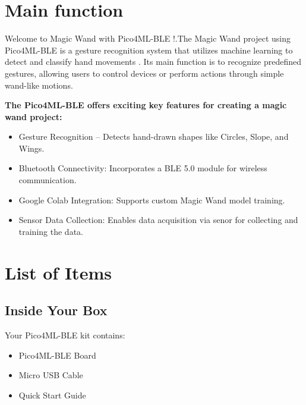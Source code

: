 %
%


\chapter{Main function}


Welcome to Magic Wand with Pico4ML-BLE !.The Magic Wand project using Pico4ML-BLE is a gesture recognition system that utilizes machine learning to detect and classify hand movements \cite{arducam}. Its main function is to recognize predefined gestures, allowing users to control devices or perform actions through simple wand-like motions.

\bigskip

\textbf{The Pico4ML-BLE offers exciting key features for creating a magic wand project:}

\begin{itemize}
    \item Gesture Recognition – Detects hand-drawn shapes like Circles, Slope, and Wings.
    \item Bluetooth Connectivity: Incorporates a BLE 5.0 module for wireless communication.
    \item Google Colab Integration: Supports custom Magic Wand model training.
    \item Sensor Data Collection: Enables data acquisition via senor for collecting and training the data.
\end{itemize}



\chapter{List of Items}\label{chap:list_of_items}

\section{Inside Your Box}

Your Pico4ML-BLE kit contains:

\begin{itemize}
    \item Pico4ML-BLE Board
    \item Micro USB Cable
    \item Quick Start Guide
\end{itemize}



